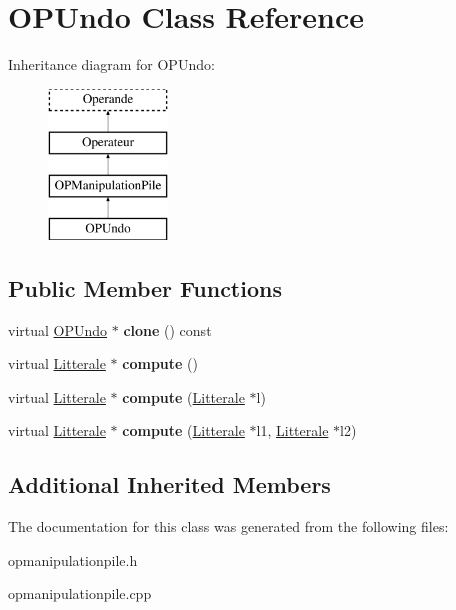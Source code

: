 \hypertarget{class_o_p_undo}{}\section{O\+P\+Undo Class Reference}
\label{class_o_p_undo}
Inheritance diagram for O\+P\+Undo\+:\begin{figure}[H]
\begin{center}
\leavevmode
\includegraphics[height=4.000000cm]{class_o_p_undo}
\end{center}
\end{figure}
\subsection*{Public Member Functions}
\begin{DoxyCompactItemize}
\item 
virtual \hyperlink{class_o_p_undo}{O\+P\+Undo} $\ast$ {\bfseries clone} () const \hypertarget{class_o_p_undo_a35a6a21c99215de99771a61710f5b346}{}\label{class_o_p_undo_a35a6a21c99215de99771a61710f5b346}

\item 
virtual \hyperlink{class_litterale}{Litterale} $\ast$ {\bfseries compute} ()\hypertarget{class_o_p_undo_a99ade45ce5516de33e4a1e89627a95ef}{}\label{class_o_p_undo_a99ade45ce5516de33e4a1e89627a95ef}

\item 
virtual \hyperlink{class_litterale}{Litterale} $\ast$ {\bfseries compute} (\hyperlink{class_litterale}{Litterale} $\ast$l)\hypertarget{class_o_p_undo_a7cd5dd4bba9c037e267af70ef63ae746}{}\label{class_o_p_undo_a7cd5dd4bba9c037e267af70ef63ae746}

\item 
virtual \hyperlink{class_litterale}{Litterale} $\ast$ {\bfseries compute} (\hyperlink{class_litterale}{Litterale} $\ast$l1, \hyperlink{class_litterale}{Litterale} $\ast$l2)\hypertarget{class_o_p_undo_af1c2d82c99ff4572243a431f8a3524b9}{}\label{class_o_p_undo_af1c2d82c99ff4572243a431f8a3524b9}

\end{DoxyCompactItemize}
\subsection*{Additional Inherited Members}


The documentation for this class was generated from the following files\+:\begin{DoxyCompactItemize}
\item 
opmanipulationpile.\+h\item 
opmanipulationpile.\+cpp\end{DoxyCompactItemize}
